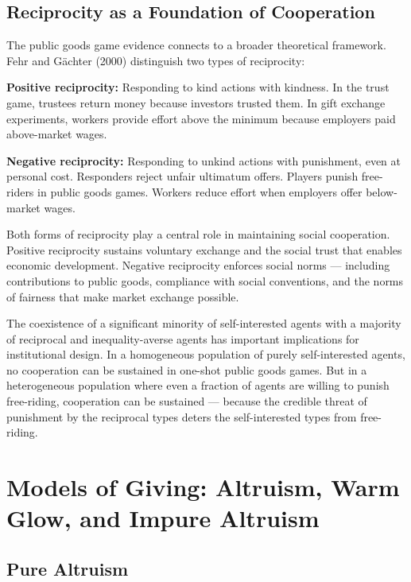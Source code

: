 \documentclass[12pt, letterpaper]{article}
\begin{document}
\subsection{Reciprocity as a Foundation of Cooperation}


The public goods game evidence connects to a broader theoretical framework. Fehr and Gächter (2000) distinguish two types of reciprocity:

\textbf{Positive reciprocity:} Responding to kind actions with kindness. In the trust game, trustees return money because investors trusted them. In gift exchange experiments, workers provide effort above the minimum because employers paid above-market wages.

\textbf{Negative reciprocity:} Responding to unkind actions with punishment, even at personal cost. Responders reject unfair ultimatum offers. Players punish free-riders in public goods games. Workers reduce effort when employers offer below-market wages.

Both forms of reciprocity play a central role in maintaining social cooperation. Positive reciprocity sustains voluntary exchange and the social trust that enables economic development. Negative reciprocity enforces social norms --- including contributions to public goods, compliance with social conventions, and the norms of fairness that make market exchange possible.

The coexistence of a significant minority of self-interested agents with a majority of reciprocal and inequality-averse agents has important implications for institutional design. In a homogeneous population of purely self-interested agents, no cooperation can be sustained in one-shot public goods games. But in a heterogeneous population where even a fraction of agents are willing to punish free-riding, cooperation can be sustained --- because the credible threat of punishment by the reciprocal types deters the self-interested types from free-riding.

\medskip


\section{Models of Giving: Altruism, Warm Glow, and Impure Altruism}



\subsection{Pure Altruism}
\end{document}
